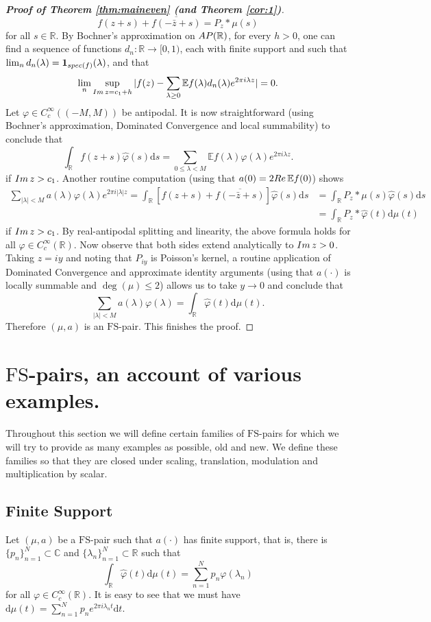 \documentclass[a4paper,reqno,12pt]{amsart}
\newcommand{\E}{\mathcal{E}}
\renewcommand{\r}{\mathbb{R}}
\newcommand{\cp}{\mathbb{C}} %
\newcommand{\re}{{\rm Re}\,}
\newcommand{\ft}{\widehat}
\newcommand{\la}{\lambda}
\newcommand{\p}{\varphi}
\renewcommand{\d}{\mathrm{d}}
\newcommand{\1}{{\bf 1}}
\newcommand{\fs}{\mathrm{FS}}
\renewcommand{\E}{\mathbb{E}}
\newcommand{\ov}[1]{\overline{#1}}
\newcommand{\apr}{{\rm AP}(\r)}
\renewcommand{\1}{{\bo 1}}
\renewcommand{\Im}{{\rm Im}\,}
\newcommand{\spec}{{\rm spec}}
\renewcommand{\a}{a(\cdot)}
\begin{document}
\begin{proof}[\bf Proof of Theorem \ref{thm:maineven} (and Theorem \ref{cor:1})]
$$
{f(z+s)+\ov{f(-\bar z +s)}} = P_z * \mu(s)
$$
for all $s\in\r$. By Bochner's approximation on $\apr$, for every $h>0$, one can find a sequence of functions $d_n:\r\to[0,1)$, each with finite support and such that $\lim_{n} d_n(\la)={\bf 1}_{\spec(f)}(\la)$, and that
$$
\lim_n \sup_{\Im z = c_1+h} |f(z) - \sum_{\la \geq 0} \E f(\la)d_n(\la) e^{2\pi i \la z}| = 0.
$$
Let $\p \in C_c^\infty((-M,M))$ be antipodal. It is now straightforward (using Bochner's approximation, Dominated Convergence and local summability) to conclude that
$$
\int_{\r} f(z+s)\ft \p(s) \d s = \sum_{0\leq \la < M} \E f(\la) \p(\la) e^{2\pi i \la z}.
$$
if $\Im z> c_1$. Another routine computation (using that $a(0)=2\re \E f(0)$) shows
\begin{align*}
\sum_{|\la|<M} a(\la) \p(\la) e^{2\pi i |\la| z} = \int_\r [{f(z+s)+\ov{f(-\bar z +s)}}] \ft \p(s)\d s &= \int_{\r} P_z * \mu(s)\ft \p(s) \d s \\
& = \int_{\r} P_z * \ft \p(t) \d \mu(t)
\end{align*}
if $\Im z> c_1$. By real-antipodal splitting and linearity, the above formula holds for all $\p\in C_c^\infty(\r)$. Now observe that both sides extend analytically to $\Im z >0$. Taking $z=iy$ and noting that $P_{iy}$ is Poisson's kernel, a routine application of Dominated Convergence and approximate identity arguments (using that $\a$ is locally summable and $\deg(\mu)\leq 2$) allows us to take $y\to 0$ and conclude that
$$
\sum_{|\la|<M} a(\la) \p(\la)  =\int_\r \ft \p(t) \d \mu(t).
$$
Therefore $(\mu,a)$ is an $\fs$-pair. This finishes the proof.
\end{proof}

\section{$\fs$-pairs, an account of various examples.}\label{sec:exemp}
Throughout this section we will define certain families of $\fs$-pairs for which we will try to provide as many examples as possible, old and new. We define these families so that they are closed under scaling, translation, modulation and multiplication by scalar.

\subsection{Finite Support}
Let $(\mu,a)$ be a $\fs$-pair such that $\a$ has finite support, that is, there is $\{p_n\}_{n=1}^N\subset \cp$ and $\{\la_n\}_{n=1}^N\subset \r$ such that
$$
\int_\r \ft \p(t) \d\mu (t) = \sum_{n=1}^N p_n \p(\la_n)
$$
for all $\p\in C^\infty_c(\r)$. It is easy to see that we must have $\d\mu (t) = \sum_{n=1}^N p_n e^{2\pi i \la_n t}\d t$. 
\end{document}
